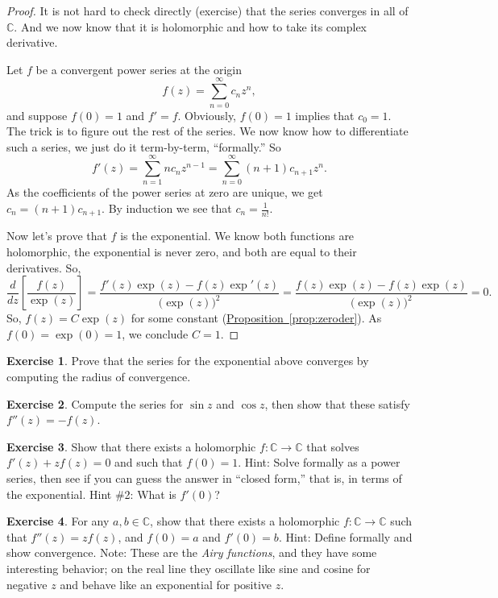 \documentclass[12pt,openany]{book}
\newcommand{\C}{{\mathbb{C}}}
\newcommand{\myindex}[1]{#1\index{#1}}
\theoremstyle{plain}
\theoremstyle{remark}
\theoremstyle{definition}
\newenvironment{exbox}{%
    \def\FrameCommand{\vrule width 1pt \relax\hspace{10pt}}%
    \MakeFramed{\advance\hsize-\width\FrameRestore}%
}{%
    \endMakeFramed
}
\theoremstyle{exercise}
\newtheorem{exercise}{Exercise}[section]
\theoremstyle{example}
\newcommand{\propref}[1]{\hyperref[#1]{Proposition~\ref*{#1}}}
\begin{document}
\begin{proof}
It is not hard to check directly (exercise)
that the series converges in all of $\C$.
And we now know that it is holomorphic and how to take its complex derivative.

Let $f$ be a convergent power series at the origin
\begin{equation*}
f(z) = \sum_{n=0}^\infty c_n z^n ,
\end{equation*}
and suppose $f(0)=1$ and $f'=f$.
Obviously, $f(0)=1$ implies that $c_0 = 1$.
The trick is to figure out the rest of the series.
We now know how to
differentiate such a series, we just do it term-by-term, ``formally.''
So
\begin{equation*}
f'(z) =
\sum_{n=1}^\infty n c_n z^{n-1} =
\sum_{n=0}^\infty (n+1) c_{n+1} z^{n} .
\end{equation*}
As the coefficients of the power series at zero are unique, we get
$c_n = (n+1) c_{n+1}$.  By induction we see that $c_n = \frac{1}{n!}$.

Now let's prove that $f$ is the exponential.  We know both functions are
holomorphic, the exponential is never zero, and both are equal to their
derivatives.  So,
\begin{equation*}
\frac{d}{dz} \left[ \frac{f(z)}{\exp(z)} \right]
=
\frac{f'(z)\exp(z) - f(z) \exp'(z)}{{\bigl(\exp(z)\bigr)}^2}
=
\frac{f(z)\exp(z) - f(z) \exp(z)}{{\bigl(\exp(z)\bigr)}^2}
= 0.
\end{equation*}
So, $f(z) = C \exp(z)$ for some constant (\propref{prop:zeroder}).
As $f(0) = \exp(0) = 1$,
we conclude $C=1$.
\end{proof}

\begin{exbox}
\begin{exercise}
Prove that the series for the exponential above converges by computing
the radius of convergence.
\end{exercise}

\begin{exercise}
Compute the series for $\sin z$ and $\cos z$, then show that these satisfy
$f''(z) = -f(z)$.
\end{exercise}

\begin{exercise}
Show that there exists a holomorphic $f \colon \C \to \C$ that
solves $f'(z) + z f(z) = 0$ and such that $f(0) = 1$.  Hint: Solve formally
as a power series,
then see if you can guess the answer in ``closed form,'' that is, in terms
of the exponential.  Hint \#2: What is $f'(0)$?
\end{exercise}

\begin{exercise}
For any $a,b \in \C$, show that there exists a holomorphic $f \colon \C \to
\C$ such that $f''(z) = z f(z)$, and $f(0) = a$ and $f'(0) = b$.
Hint: Define formally and show convergence.
Note: These are the \emph{\myindex{Airy functions}}, and they have some
interesting behavior; on the real line they oscillate like sine and cosine
for negative $z$ and behave like an exponential for positive $z$.
\end{exercise}
\end{exbox}
\end{document}
